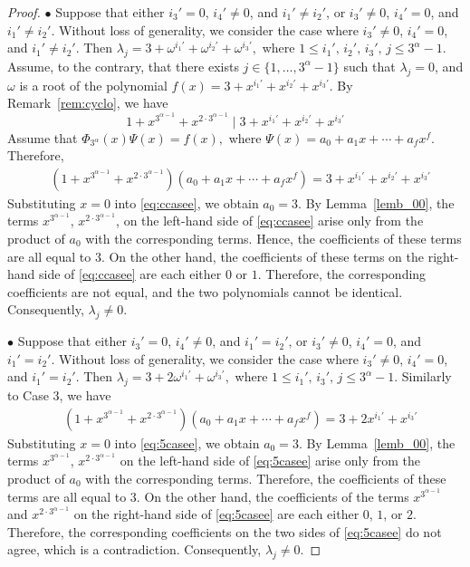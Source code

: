 \documentclass[12pt]{article}
\begin{document}
\begin{proof}
  $\bullet$  Suppose that either $i_3'=0$, $i_4'\neq0$, and $i_1'\neq i_2'$, or $i_3'\neq0$, $i_4'=0$, and $i_1'\neq i_2'$. Without loss of generality, we consider the case where $i_3'\neq0$, $i_4'=0$, and $i_1'\neq i_2'$. Then
 $
 \lambda_j=3+\omega^{i_1'}+\omega^{i_2'}+\omega^{i_3'},
 $
 where $1\le i_1',\,i_2',\,i_3',\,j\le3^\alpha-1$. Assume, to the contrary, that there exists $j\in\{1,\ldots,3^\alpha-1\}$ such that $\lambda_j=0$, and $\omega$ is a root of the polynomial
 $
 f(x)=3+x^{i_1'}+x^{i_2'}+x^{i_3'}
 $. By Remark~\ref{rem:cyclo}, we have
 \[
 1+x^{3^{\alpha-1}}+x^{2\cdot3^{\alpha-1}}
 \mid
 3+x^{i_1'}+x^{i_2'}+x^{i_3'}
 \]
 Assume that
 $
 \Phi_{3^\alpha}(x)\Psi(x)	=f(x),
 $
 where
 $
 \Psi(x)=a_0+a_1x+\cdots+a_fx^f.
 $
 Therefore,
 \begin{equation}\label{eq:ccasee}
 	\begin{aligned}
 		&\left(1+x^{3^{\alpha-1}}+x^{2\cdot3^{\alpha-1}}\right)
 		\left(a_0+a_1x+\cdots+a_fx^f\right)
 		=3+x^{i_1'}+x^{i_2'}+x^{i_3'}
 	\end{aligned}
 \end{equation}
 Substituting $x=0$ into \eqref{eq:ccasee}, we obtain $a_0=3$. By Lemma~\ref{lemb_00}, the terms $x^{3^{\alpha-1}}$, $x^{2\cdot3^{\alpha-1}}$, on the left-hand side of \eqref{eq:ccasee} arise only from the product of $a_0$ with the corresponding terms. Hence, the coefficients of these terms are all equal to $3$. On the other hand, the coefficients of these terms on the right-hand side of \eqref{eq:ccasee} are each either $0$ or $1$. Therefore, the corresponding coefficients are not equal, and the two polynomials cannot be identical. Consequently, $\lambda_j\neq0$.

 \medskip

  $\bullet$  Suppose that either $i_3'=0$, $i_4'\neq0$, and $i_1'= i_2'$, or $i_3'\neq0$, $i_4'=0$, and $i_1'= i_2'$. Without loss of generality, we consider the case where $i_3'\neq0$, $i_4'=0$, and $i_1'= i_2'$. Then
 $
 \lambda_j=3+2\omega^{i_1'}+\omega^{i_3'},
 $
 where $1\le i_1',\,i_3',\,j\le3^\alpha-1$. Similarly to Case 3, we have
 \begin{equation}\label{eq:5casee}
 	\begin{aligned}
 		&\left(1+x^{3^{\alpha-1}}+x^{2\cdot3^{\alpha-1}}\right)
 		\left(a_0+a_1x+\cdots+a_fx^f\right)
 		=3+2x^{i_1'}+x^{i_3'}
 	\end{aligned}
 \end{equation} 	
 Substituting $x=0$ into \eqref{eq:5casee}, we obtain $a_0=3$. By Lemma~\ref{lemb_00}, the terms $x^{3^{\alpha-1}}$, $x^{2\cdot3^{\alpha-1}}$ on the left-hand side of \eqref{eq:5casee} arise only from the product of $a_0$ with the corresponding terms. Therefore, the coefficients of these terms are all equal to $3$. On the other hand, the coefficients of the terms $x^{3^{\alpha-1}}$ and $x^{2\cdot3^{\alpha-1}}$ on the right-hand side of \eqref{eq:5casee} are each either $0$, $1$, or $2$. Therefore, the corresponding coefficients on the two sides of \eqref{eq:5casee} do not agree, which is a contradiction. Consequently, $\lambda_j\neq0$.


\end{proof}
\end{document}
